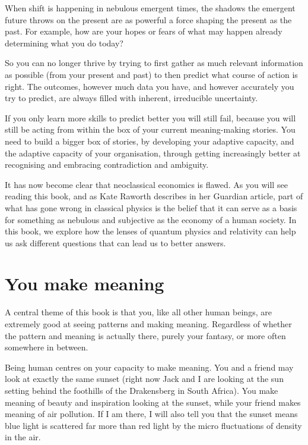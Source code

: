 When shift is happening in nebulous emergent times, the shadows the emergent future throws on the present are as powerful a force shaping the present as the past. For example, how are your hopes or fears of what may happen already determining what you do today?


So you can no longer thrive by trying to first gather as much relevant information as possible (from your present and past) to then predict what course of action is right. The outcomes, however much data you have, and however accurately you try to predict, are always filled with inherent, irreducible uncertainty. 


If you only learn more skills to predict better you will still fail, because you will still be acting from within the box of your current meaning\hyp{}making stories. You need to build a bigger box of stories, by developing your adaptive capacity, and the adaptive capacity of your organisation, through getting increasingly better at recognising and embracing contradiction and ambiguity. 


It has now become clear that neoclassical economics is flawed. As you will see reading this book, and as Kate Raworth\cite{raworth-doughnut} describes in her Guardian article\cite{raworth-guardian}, part of what has gone wrong in classical physics is the belief that it can serve as a basis for something as nebulous and subjective as the economy of a human society. In this book, we explore how the lenses of quantum physics and relativity can help us ask different questions that can lead us to better answers.


\section{You make meaning}
A central theme of this book is that you, like all other human beings, are extremely good at seeing patterns and making meaning. Regardless of whether the pattern and meaning is actually there, purely your fantasy, or more often somewhere in between.


Being human centres on your capacity to make meaning. You and a friend may look at exactly the same sunset (right now Jack and I are looking at the sun setting behind the foothills of the Drakensberg in South Africa). You make meaning of beauty and inspiration looking at the sunset, while your friend makes meaning of air pollution. If I am there, I will also tell you that the sunset means blue light is scattered far more than red light by the micro fluctuations of density in the air.


